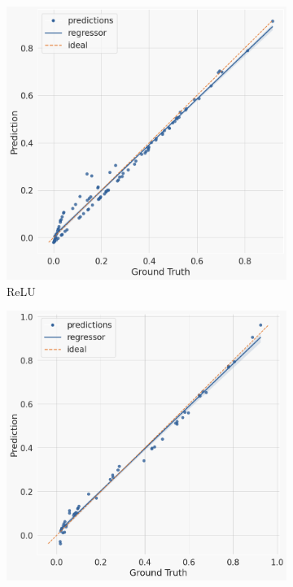 \begin{figure}[h]
        \centering
        \begin{subfigure}[b]{0.47\textwidth}
            \centering
            \includegraphics[width=\textwidth]{resources/scatter-relu.png}
            \caption[]%
            {{\small ReLU}}    
            \label{fig:layer-scatterplots relu}
        \end{subfigure}
        \hfill
        \begin{subfigure}[b]{0.47\textwidth}  
            \centering 
            \includegraphics[width=\textwidth]{resources/scatter-sigmoid.png}

\end{subfigure}
\end{figure}
